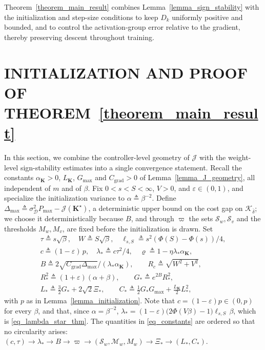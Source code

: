 \documentclass[letterpaper, 10 pt, conference]{ieeeconf}
\newcommand{\bK}{\mathbf{K}}
\newcommand{\cD}{\mathcal{D}}
\newcommand{\cJ}{\mathcal{J}}
\newcommand{\cK}{\mathcal{K}}
\newcommand{\cM}{\mathcal{M}}
\newcommand{\cS}{\mathcal{S}}
\newcommand{\Lemm}{Lemma}
\newcommand{\Thm}{Theorem}
\begin{document}
\Thm~\ref{theorem_main_result} combines \Lemm~\ref{lemma_sign_stability} with the initialization and step-size conditions to keep $D_k$ uniformly positive and bounded, and to control the activation-group error relative to the gradient, thereby preserving descent throughout training.

\section{INITIALIZATION AND PROOF OF THEOREM~\ref{theorem_main_result}}
\label{section_proof_main_result}

In this section, we combine the controller-level geometry of $\cJ$ with the weight-level sign-stability estimates into a single convergence statement. Recall the constants $\alpha_{\bK}>0$, $L_{\bK}$, $G_{\max}$ and $C_{\mathrm{grad}}>0$ of \Lemm~\ref{lemma_J_geometry}, all independent of $m$ and of $\beta$. Fix $0<s<S<\infty$, $V>0$, and $\varepsilon \in (0,1)$, and specialize the initialization variance to $\alpha \triangleq \beta^{-2}$. Define $\Delta_{\max} \triangleq \sigma_{\cD}^{2} P_{\max} - \cJ(\bK^{\star})$, a deterministic upper bound on the cost gap on $\cK_{\overline{\delta}}$; we choose it deterministically because $B$, and through $\varpi$ the sets $\cS_{w},\cS_{v}$ and the thresholds $M_{w},M_{v}$, are fixed before the initialization is drawn. Set
\begin{equation} \label{eq_constants}
    \begin{gathered}
        \tau {\triangleq} s\sqrt{\beta},\quad
        W {\triangleq} S\sqrt{\beta},\quad
        \ell_{s,S} {\triangleq} {s^2(\Phi(S)-\Phi(s))}/{4},
        \\
        c {\triangleq} (1{-}\varepsilon)\,p, \quad
        \lambda_{\ast} {\triangleq} {c\tau^2}/{4}, \quad
        \varrho {\triangleq} 1 - \eta \lambda_{\ast} \alpha_{\bK},
        \\
        B {\triangleq} {2\sqrt{C_{\mathrm{grad}}\Delta_{\max}}}/{(\lambda_{\ast} \alpha_{\bK})}, \qquad
        R_c {\triangleq} \sqrt{W^{2}{+}V^{2}},\;\;
        \\
        R_{\ast}^{2} {\triangleq} (1 {+} \varepsilon)(\alpha {+} \beta), \qquad    
        G_{\ast} {\triangleq} e^{2B} R_{\ast}^{2},\;\; \\
        L_{\ast} {\triangleq} \tfrac{3}{2} G_{\ast} {+} 2 \sqrt{2} \Xi_{\ast}, \qquad
        C_{\ast} {\triangleq} \tfrac{1}{2}G_{\ast} G_{\max} {+} \tfrac{L_{\bK}}{2} L_{\ast}^{2},
    \end{gathered}
\end{equation}
with $p$ as in \Lemm~\ref{lemma_initialization}. Note that $c = (1-\varepsilon)p \in (0,p)$ for every $\beta$, and that, since $\alpha = \beta^{-2}$, $\lambda_{\ast} = (1-\varepsilon)\bigl(2\Phi(V\beta)-1\bigr)\ell_{s,S}\,\beta$, which is \eqref{eq_lambda_star_thm}. The quantities in \eqref{eq_constants} are ordered so that no circularity arises: $(c,\tau) \to \lambda_{\ast} \to B \to \varpi \to (\cS_w,\cM_w,M_w) \to \Xi_{\ast} \to (L_{\ast}, C_{\ast})$.
 
\end{document}
